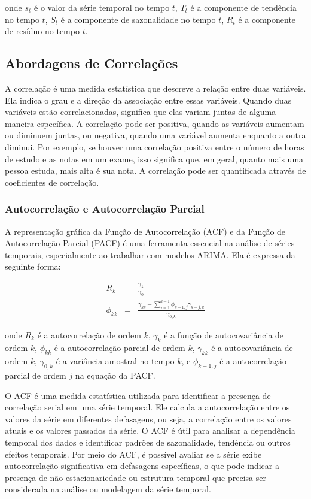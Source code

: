 \noindent onde $s_t$ é o valor da série temporal no tempo $t$, $T_t$ é a componente de tendência no tempo $t$, $S_t$ é a componente de sazonalidade no tempo $t$, $R_t$ é a componente de resíduo no tempo $t$.
 
 \subsection{Abordagens de Correla\c c\~oes}
 
 A correlação é uma medida estatística que descreve a relação entre duas variáveis. Ela indica o grau e a direção da associação entre essas variáveis. Quando duas variáveis estão correlacionadas, significa que elas variam juntas de alguma maneira específica. A correlação pode ser positiva, quando as variáveis aumentam ou diminuem juntas, ou negativa, quando uma variável aumenta enquanto a outra diminui. Por exemplo, se houver uma correlação positiva entre o número de horas de estudo e as notas em um exame, isso significa que, em geral, quanto mais uma pessoa estuda, mais alta é sua nota. A correlação pode ser quantificada através de coeficientes de correlação.
 
 \subsubsection{Autocorrela\c c\~ao e Autocorrela\c c\~ao Parcial}
 
 A representação gráfica da Função de Autocorrelação (ACF) e da Função de Autocorrelação Parcial (PACF) é uma ferramenta essencial na análise de séries temporais, especialmente ao trabalhar com modelos ARIMA. Ela é expressa da seguinte forma:
 
 \begin{eqnarray}
 	R_k &=& \frac{\gamma_k}{\gamma_0} \\ 
 	\phi_{kk} &=& \frac{\gamma_{kk} - \sum_{j=1}^{k-1} \phi_{k-1,j} \gamma_{k-j,k}}{\gamma_{0,k}}
 \end{eqnarray}
 
 \noindent onde $ R_k $ é a autocorrelação de ordem $ k $, $ \gamma_k $ é a função de autocovariância de ordem $ k $, $ \phi_{kk} $ é a autocorrelação parcial de ordem $ k $, $ \gamma_{kk} $ é a autocovariância de ordem $ k $, $ \gamma_{0,k} $ é a variância amostral no tempo $ k $, e $ \phi_{k-1,j} $ é a autocorrelação parcial de ordem $ j $ na equação da PACF.
 
 O ACF é uma medida estatística utilizada para identificar a presença de correlação serial em uma série temporal. Ele calcula a autocorrelação entre os valores da série em diferentes defasagens, ou seja, a correlação entre os valores atuais e os valores passados da série. O ACF é útil para analisar a dependência temporal dos dados e identificar padrões de sazonalidade, tendência ou outros efeitos temporais. Por meio do ACF, é possível avaliar se a série exibe autocorrelação significativa em defasagens específicas, o que pode indicar a presença de não estacionariedade ou estrutura temporal que precisa ser considerada na análise ou modelagem da série temporal.
 

